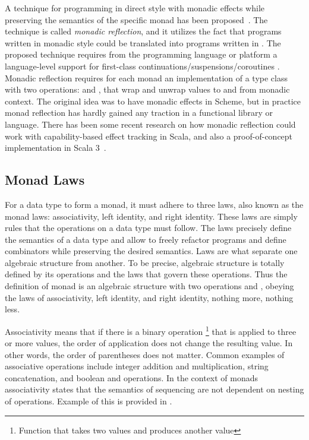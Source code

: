 

A technique for programming in direct style with monadic effects while preserving the semantics of the specific monad has been proposed~\cite{representing-monads}. The technique is called \textit{monadic reflection}, and it utilizes the fact that programs written in monadic style could be translated into programs written in . The proposed technique requires from the programming language or platform a language-level support for first-class continuations/suspensions/coroutines . Monadic reflection requires for each monad an implementation of a type class with two operations:  and , that wrap and unwrap values to and from monadic context. The original idea was to have monadic effects in Scheme, but in practice monad reflection has hardly gained any traction in a functional library or language. There has been some recent research on how monadic reflection could work with capability-based effect tracking in Scala, and also a proof-of-concept implementation in Scala 3~\cite{representing-monads-capabilities, monadic-reflection-scala}.


\subsection{Monad Laws} \label{monad:laws}
For a data type to form a monad, it must adhere to three laws, also known as the monad laws: associativity, left identity, and right identity. These laws are simply rules that the operations on a data type must follow. The laws precisely define the semantics of a data type and allow to freely refactor programs and define combinators while preserving the desired semantics. Laws are what separate one algebraic structure from another. To be precise, algebraic structure is totally defined by its operations and the laws that govern these operations. Thus the definition of monad is an algebraic structure with two operations
 and , obeying the laws of associativity, left identity, and right identity, nothing more, nothing less.~\cite{fp-in-scala}



Associativity means that if there is a binary operation \footnote{Function that takes two values and produces another value} that is applied to three or more values, the order of application does not change the resulting value. In other words, the order of parentheses does not matter. Common examples of associative operations include integer addition and multiplication, string concatenation, and boolean \inlinecode{&&} and \inlinecode{||} operations. In the context of monads associativity states that the semantics of sequencing are not dependent on nesting of  operations. Example of this is provided in .


